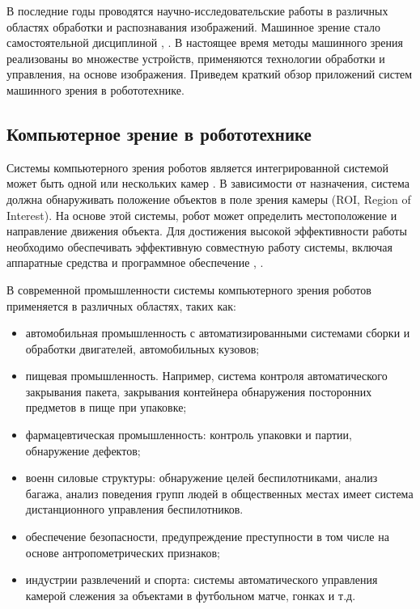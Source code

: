 В последние годы проводятся научно-исследовательские работы в различных областях обработки и распознавания изображений. Машинное зрение стало самостоятельной дисциплиной \cite{Huang1991}, \cite{Kevin1991}. В настоящее время методы машинного зрения реализованы во множестве устройств, применяются технологии обработки и управления, на основе изображения. Приведем краткий обзор приложений систем машинного зрения в робототехнике.

\subsection{Компьютерное зрение в робототехнике}

Системы компьютерного зрения роботов является интегрированной системой может быть одной или нескольких камер \cite{Abebe2016}. В зависимости от назначения, система должна обнаруживать положение объектов в поле зрения камеры (ROI, Region of Interest). На основе этой системы, робот может определить местоположение и направление движения объекта. Для достижения высокой эффективности работы необходимо обеспечивать эффективную совместную работу системы, включая аппаратные средства и программное обеспечение \cite{Zhu2004}, \cite{Vayda1991}.

В современной промышленности системы компьютерного зрения роботов применяется в различных областях, таких как:

\begin{itemize}
	\item автомобильная промышленность с автоматизированными системами сборки и обработки двигателей, автомобильных кузовов;
	\item пищевая промышленность. Например, система контроля автоматического закрывания пакета, закрывания контейнера  обнаружения посторонних предметов в пище при упаковке;
	\item фармацевтическая промышленность: контроль упаковки и партии, обнаружение дефектов;
	\item военн силовые структуры: обнаружение целей беспилотниками, анализ багажа, анализ поведения групп людей в общественных местах имеет система дистанционного управления беспилотников.
	\item обеспечение безопасности, предупреждение преступности в том числе на основе антропометрических признаков;
	\item индустрии развлечений  и спорта: системы автоматического управления камерой слежения за объектами в футбольном матче, гонках и т.д.
\end{itemize}

